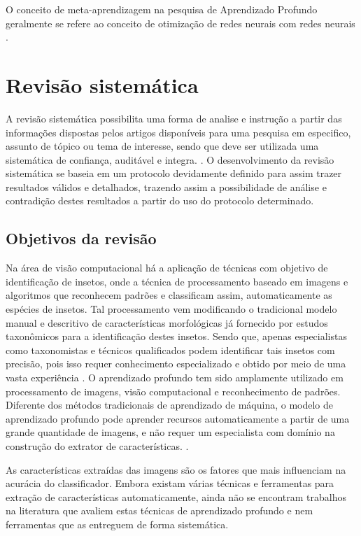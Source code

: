 \documentclass[
	12pt,				%
	oneside,			%
	a4paper,			%
	english,			%
	brazil				%
	]{abntex2ppgsi}
\begin{document}
O conceito de meta-aprendizagem na pesquisa de Aprendizado Profundo geralmente se refere ao conceito de otimização de redes neurais com redes neurais \cite{shorten2019survey}.

\chapter{Revisão sistemática}

A revisão sistemática possibilita uma forma de analise e instrução a partir das informações dispostas pelos artigos disponíveis para uma pesquisa em especifico, assunto de tópico ou tema de interesse, sendo que deve ser utilizada uma sistemática de confiança, auditável e integra. \cite{garcia2020guidelines}.
O desenvolvimento da revisão sistemática se baseia em um protocolo devidamente definido para assim trazer resultados válidos e detalhados, trazendo assim a possibilidade de análise e contradição destes resultados a partir do uso do protocolo determinado.

\section{Objetivos da revisão}

Na área de visão computacional há a aplicação de técnicas com objetivo de identificação de insetos, onde a técnica de processamento baseado em imagens e algoritmos que reconhecem padrões e classificam assim, automaticamente as espécies de insetos. Tal processamento vem modificando o tradicional modelo manual e descritivo de características morfológicas já fornecido por estudos taxonômicos para a identificação destes insetos. Sendo que, apenas especialistas como taxonomistas e técnicos qualificados podem identificar tais insetos com precisão, pois isso requer conhecimento especializado e obtido por meio de uma vasta experiência \cite{lim2017performance}.
O aprendizado profundo tem sido amplamente utilizado em processamento de imagens, visão computacional e reconhecimento de padrões. Diferente dos métodos tradicionais de aprendizado de máquina, o modelo de aprendizado profundo pode aprender recursos automaticamente a partir de uma grande quantidade de imagens, e não requer um especialista com domínio na construção do extrator de características. \cite{liu2020classification}.

As características extraídas das imagens são os fatores que mais influenciam na acurácia do classificador. Embora existam várias técnicas e ferramentas para extração de características automaticamente, ainda não se encontram trabalhos na literatura que avaliem estas técnicas de aprendizado profundo e nem ferramentas que as entreguem de forma sistemática.
\end{document}
